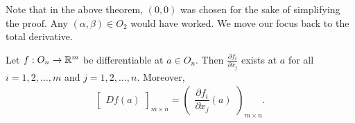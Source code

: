 Note that in the above theorem, $(0,0)$ was chosen for the sake of simplifying the proof. Any $(\alpha,\beta) \in O_{2}$ would have worked. We move our focus back to the total derivative.

\begin{theorem}
    Let $f:O_{n} \to \mathbb{R}^{m}$ be differentiable at $a \in O_{n}$. Then $\frac{\partial f_{i}}{\partial x_{j}}$ exists at $a$ for all $i = 1,2,\ldots,m$ and $j = 1,2,\ldots,n$. Moreover,
    \begin{align}
        \begin{bmatrix}
            Df(a)
        \end{bmatrix}_{m \times n} = \begin{pmatrix}
            \dfrac{\partial f_{i}}{\partial x_{j}}(a)
        \end{pmatrix}_{m \times n}.
    \end{align}
\end{theorem}

